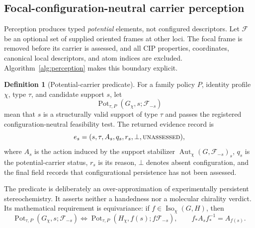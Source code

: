 \documentclass[pdflatex,sn-mathphys-num,referee,lineno]{sn-jnl}
\theoremstyle{plain}
\theoremstyle{remark}
\theoremstyle{definition}
\newtheorem{definition}{Definition}
\begin{document}
\subsection{Focal-configuration-neutral carrier perception}
\label{sec:perception-algorithm}

Perception produces typed \emph{potential} elements, not configured
descriptors.  Let \(\mathcal F\) be an optional set of supplied oriented frames
at other loci.  The focal frame is removed before its carrier is assessed, and
all CIP properties, coordinates, canonical local descriptors, and atom indices
are excluded.  Algorithm~\ref{alg:perception} makes this boundary explicit.

\begin{definition}[Potential-carrier predicate]
\label{def:potential-carrier}
For a family policy \(P\), identity profile \(\chi\), type \(\tau\), and
candidate support \(s\), let
\[
  \operatorname{Pot}_{\tau,P}(G_\chi,s;\mathcal F_{-s})
\]
mean that \(s\) is a structurally valid support of type \(\tau\) and passes
the registered configuration-neutral feasibility test.  The returned evidence
record is
\[
  e_s=(s,\tau,A_s,q_s,r_s,\bot,\textsc{unassessed}),
\]
where \(A_s\) is the action induced by the support stabilizer
\(\operatorname{Aut}_\chi(G,\mathcal F_{-s})_s\), \(q_s\) is the potential-carrier status,
\(r_s\) is its reason, \(\bot\) denotes absent configuration, and the final
field records that configurational persistence has not been assessed.
\end{definition}

The predicate is deliberately an over-approximation of experimentally
persistent stereochemistry.  It asserts neither a handedness nor a molecular
chirality verdict.  Its mathematical requirement is equivariance: if
\(f\in\operatorname{Iso}_\chi(G,H)\), then
\begin{equation}
  \operatorname{Pot}_{\tau,P}(G_\chi,s;\mathcal F_{-s})
  \Longleftrightarrow
  \operatorname{Pot}_{\tau,P}(H_\chi,f(s);f\mathcal F_{-s}),
  \qquad
  f_*A_sf_*^{-1}=A_{f(s)} .
  \label{eq:perception-equivariance}
\end{equation}
\end{document}

